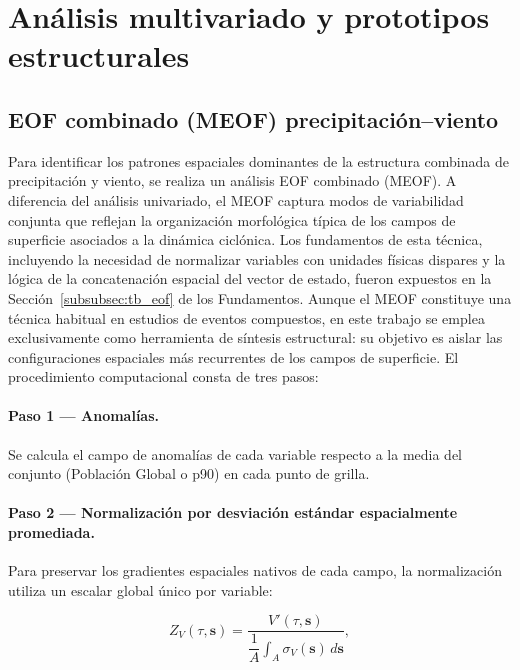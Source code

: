 
\section{Análisis multivariado y prototipos estructurales}\label{sec:meof_prototipos}

\subsection{EOF combinado (MEOF) precipitación--viento}\label{subsec:eof_multivariado}

Para identificar los patrones espaciales dominantes de la estructura combinada de precipitación y viento, se realiza un análisis EOF combinado (MEOF). A diferencia del análisis univariado, el MEOF captura modos de variabilidad conjunta que reflejan la organización morfológica típica de los campos de superficie asociados a la dinámica ciclónica. Los fundamentos de esta técnica, incluyendo la necesidad de normalizar variables con unidades físicas dispares y la lógica de la concatenación espacial del vector de estado, fueron expuestos en la Sección~\ref{subsubsec:tb_eof} de los Fundamentos. Aunque el MEOF constituye una técnica habitual en estudios de eventos compuestos, en este trabajo se emplea exclusivamente como herramienta de síntesis estructural: su objetivo es aislar las configuraciones espaciales más recurrentes de los campos de superficie. El procedimiento computacional consta de tres pasos:

\paragraph{Paso 1 — Anomalías.} Se calcula el campo de anomalías de cada variable respecto a la media del conjunto (Población Global o p90) en cada punto de grilla.

\paragraph{Paso 2 — Normalización por desviación estándar espacialmente promediada.} Para preservar los gradientes espaciales nativos de cada campo, la normalización utiliza un escalar global único por variable:

\begin{equation}
    Z_{V}(\tau, \mathbf{s}) = \frac{V'(\tau, \mathbf{s})}{\dfrac{1}{A}\displaystyle\int_{A} \sigma_{V}(\mathbf{s})\, d\mathbf{s}},
\end{equation}

